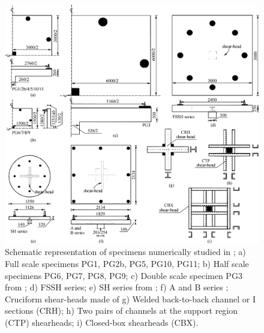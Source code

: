 \begin{figure}\centering
    \includegraphics[width=\columnwidth]{Figures/b2020f2.pdf}
    \caption{Schematic representation of specimens numerically studied in \cite{bompa2020}; a) Full scale specimens PG1, PG2b, PG5, PG10, PG11; b) Half scale specimens PG6, PG7, PG8, PG9; c) Double scale specimen PG3 from \cite{guandalini2009punching}; d) FSSH series; e) SH series from \cite{chana1996}; f) A and B series \citep{hawkins1974}; Cruciform shear-heads made of g) Welded back-to-back channel or I sections (CRH); h) Two pairs of channels at the support region (CTP) shearheads; i) Closed-box shearheads (CBX).}
    \label{b2020f2}
    \end{figure}
